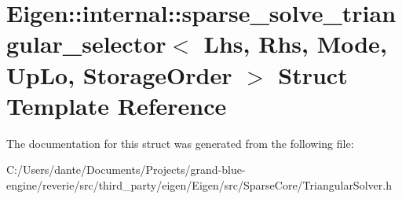 \hypertarget{struct_eigen_1_1internal_1_1sparse__solve__triangular__selector}{}\section{Eigen\+::internal\+::sparse\+\_\+solve\+\_\+triangular\+\_\+selector$<$ Lhs, Rhs, Mode, Up\+Lo, Storage\+Order $>$ Struct Template Reference}
\label{struct_eigen_1_1internal_1_1sparse__solve__triangular__selector}


The documentation for this struct was generated from the following file\+:\begin{DoxyCompactItemize}
\item 
C\+:/\+Users/dante/\+Documents/\+Projects/grand-\/blue-\/engine/reverie/src/third\+\_\+party/eigen/\+Eigen/src/\+Sparse\+Core/Triangular\+Solver.\+h\end{DoxyCompactItemize}
